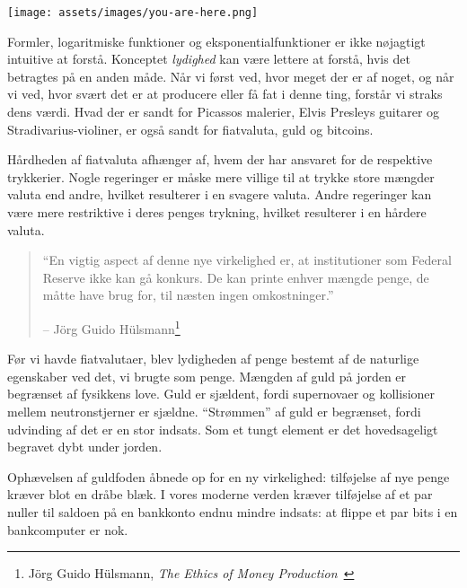 \begin{center}
  \texttt{[image: assets/images/you-are-here.png]}
  \label{fig:you-are-here.png}
\end{center}

Formler, logaritmiske funktioner og eksponentialfunktioner er ikke nøjagtigt
intuitive at forstå. Konceptet \textit{lydighed} kan være lettere at
forstå, hvis det betragtes på en anden måde. Når vi først ved, hvor meget der er
af noget, og når vi ved, hvor svært det er at producere eller
få fat i denne ting, forstår vi straks dens værdi. Hvad der er sandt for
Picassos malerier, Elvis Presleys guitarer og Stradivarius-violiner,
er også sandt for fiatvaluta, guld og bitcoins.

Hårdheden af fiatvaluta afhænger af, hvem der har ansvaret for
de respektive trykkerier. Nogle regeringer er måske mere villige til at
trykke store mængder valuta end andre, hvilket resulterer i en svagere
valuta. Andre regeringer kan være mere restriktive i deres penges
trykning, hvilket resulterer i en hårdere valuta.

\begin{samepage}\begin{quotation}
\enquote{En vigtig aspect af denne nye virkelighed er, at institutioner som
Federal Reserve ikke kan gå konkurs. De kan printe enhver mængde penge, de
måtte have brug for, til næsten ingen omkostninger.}
\begin{flushright} -- Jörg Guido Hülsmann\footnote{Jörg Guido Hülsmann, 
  \textit{The Ethics of Money Production}~\cite{hulsmann2008ethics}}
\end{flushright}\end{quotation}\end{samepage}

Før vi havde fiatvalutaer, blev lydigheden af penge bestemt af
de naturlige egenskaber ved det, vi brugte som penge. Mængden
af guld på jorden er begrænset af fysikkens love. Guld er sjældent, fordi
supernovaer og kollisioner mellem neutronstjerner er sjældne. 
\enquote{Strømmen} af guld er begrænset, fordi udvinding af det er en stor 
indsats. Som et tungt element er det hovedsageligt begravet dybt under jorden.

Ophævelsen af guldfoden åbnede op for en ny virkelighed: tilføjelse af nye penge
kræver blot en dråbe blæk. I vores moderne verden kræver tilføjelse af et par
nuller til saldoen på en bankkonto endnu mindre indsats: at flippe et par bits 
i en bankcomputer er nok.

